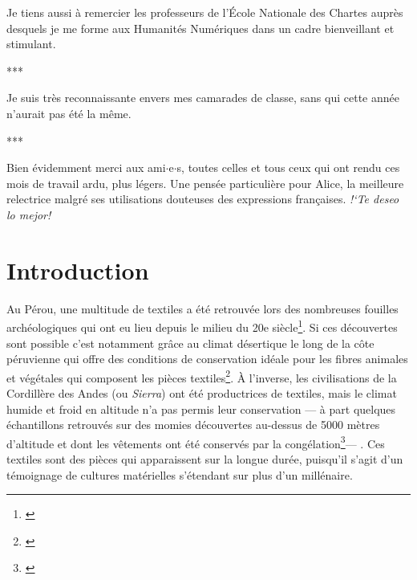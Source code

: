 \documentclass[a4paper, twoside, 12pt]{book}
\newcommand{\inclusives}[1]{$\cdot${#1}$\cdot${s}}
\begin{document}
    Je tiens aussi à remercier les professeurs de l'École Nationale des Chartes auprès desquels je me forme aux Humanités Numériques dans un cadre bienveillant et stimulant.

\begin{center}
    ***
\end{center}

    Je suis très reconnaissante envers mes camarades de classe, sans qui cette année n'aurait pas été la même.
    
\begin{center}
    ***
\end{center}

    Bien évidemment merci aux ami\inclusives{e}, toutes celles et tous ceux qui ont rendu ces mois de travail ardu, plus légers. Une pensée particulière pour Alice, la meilleure relectrice malgré ses utilisations douteuses des expressions françaises. \textit{!`Te deseo lo mejor!}



\renewcommand{\contentsname}{Sommaire}
\tableofcontents
\markboth{}{}

\clearpage

\mainmatter

\chapter*{Introduction}

Au Pérou, une multitude de textiles a été retrouvée lors des nombreuses fouilles archéologiques qui ont eu lieu depuis le milieu du 20e siècle\footnote{\cite{onealeTextilePeriodsAncient1930}}. Si ces découvertes sont possible c'est notamment grâce au climat désertique le long de la côte péruvienne qui offre des conditions de conservation idéale pour les fibres animales et végétales qui composent les pièces textiles\footnote{\cite{desrosiersTechniquesTissageOntelles2010}}. À l'inverse, les civilisations de la Cordillère des Andes (ou \textit{Sierra}) ont été productrices de textiles, mais le climat humide et froid en altitude n'a pas permis leur conservation --- à part quelques échantillons retrouvés sur des momies découvertes au-dessus de 5000 mètres d'altitude et dont les vêtements ont été conservés par la congélation\footnote{\cite{abalderussoArteTextilIncaico2010}}--- .
\noindent Ces textiles sont des pièces qui apparaissent sur la longue durée, puisqu'il s'agit d'un témoignage de cultures matérielles s'étendant sur plus d'un millénaire.
\end{document}
